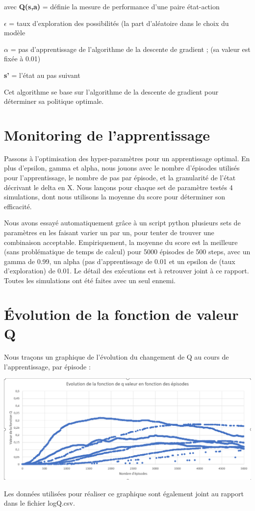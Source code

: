 \documentclass{article}
\begin{document}
\newline
avec \textbf{Q(s,a)} = définie la mesure de performance d'une paire état-action

\textbf{$\epsilon$} = taux d'exploration des possibilités (la part d'aléatoire dans le choix du modèle

\textbf{$\alpha$} = pas d'apprentissage de l'algorithme de la descente de gradient ; (sa valeur est fixée à 0.01) 

\textbf{s'} = l'état au pas suivant
\newline

Cet algorithme se base sur l'algorithme de la descente de gradient pour déterminer sa politique optimale.

\section{Monitoring de l'apprentissage}

Passons à l'optimisation des hyper-paramètres pour un apprentissage optimal. En plus d'epsilon, gamma et alpha, nous jouons avec le nombre d'épisodes utilisés pour l'apprentissage, le nombre de pas par épisode, et la granularité de l'état décrivant le delta en X. Nous lançons pour chaque set de paramètre testés 4 simulations, dont nous utilisons la moyenne du score pour déterminer son efficacité.

Nous avons essayé automatiquement grâce à un script python plusieurs sets de paramètres en les faisant varier un par un, pour tenter de trouver une combinaison acceptable. Empiriquement, la moyenne du score est la meilleure (sans problématique de temps de calcul) pour 5000 épisodes de 500 steps, avec un gamma de 0.99, un alpha (pas d'apprentissage de 0.01 et un epsilon de (taux d'exploration) de 0.01. Le détail des exécutions est à retrouver joint à ce rapport. Toutes les simulations ont été faites avec un seul ennemi.

\section{Évolution de la fonction de valeur Q}

Nous traçons un graphique de l'évolution du changement de Q au cours de l'apprentissage, par épisode : \newline

\includegraphics[scale=0.35]{graphe.png}


\newline

Les données utilisées pour réaliser ce graphique sont également joint au rapport dans le fichier logQ.csv.
\end{document}
